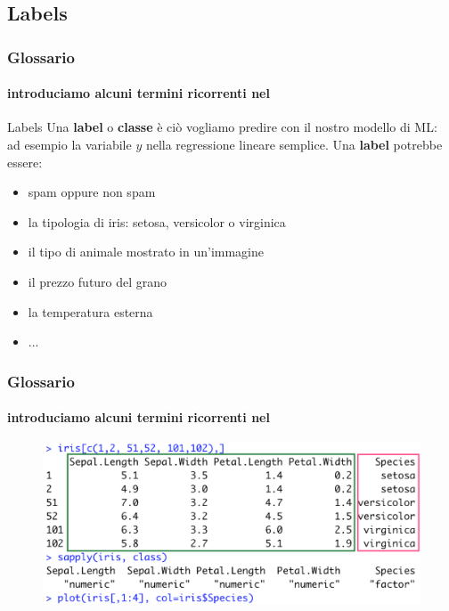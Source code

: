 \subsection[Labels]{Labels}
\begin{frame}

	\frametitle{Glossario}
	\framesubtitle{introduciamo alcuni termini ricorrenti nel \ml}

	\begin{block}{Labels}
		Una \textbf{label} o \textbf{classe} è ciò vogliamo predire con il nostro modello di ML:\\
		ad esempio la variabile $y$ nella regressione lineare semplice.
		\newlinedouble
		\pause
		Una \textbf{label} potrebbe essere:
		\begin{itemize}
			\pause
			\item spam oppure non spam
			\pause
			\item la tipologia di iris: setosa, versicolor o virginica
			\pause
			\item il tipo di animale mostrato in un'immagine
			\pause
			\item il prezzo futuro del grano
			\pause
			\item la temperatura esterna
			\pause
			\item ...
		\end{itemize}
	\end{block}

\end{frame}


\begin{frame}

	\frametitle{Glossario}
	\framesubtitle{introduciamo alcuni termini ricorrenti nel \ml}

	\begin{figure}[!htbp]
		\includegraphics[width=1.0\linewidth]{images/glossary/iris_4.png}
	\end{figure}


\end{frame}



